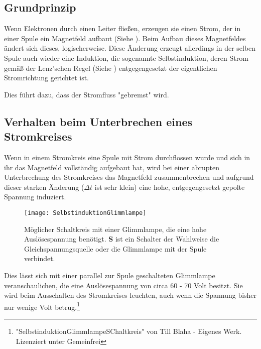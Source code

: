 \subsection{Grundprinzip}

Wenn Elektronen durch einen Leiter fließen, erzeugen sie einen Strom, der in einer Spule ein Magnetfeld aufbaut (Siehe ). Beim Aufbau dieses Magnetfeldes ändert sich dieses, logischerweise. Diese Änderung erzeugt allerdings in der selben Spule auch wieder eine Induktion, die sogenannte Selbstinduktion, deren Strom gemäß der Lenz'schen Regel (Siehe ) entgegengesetzt der eigentlichen Stromrichtung gerichtet ist.

Dies führt dazu, dass der Stromfluss "gebremst" wird.

\subsection{Verhalten beim Unterbrechen eines Stromkreises}

Wenn in einem Stromkreis eine Spule mit Strom durchflossen wurde und sich in ihr das Magnetfeld vollständig aufgebaut hat, wird bei einer abrupten Unterbrechung des Stromkreises das Magnetfeld zusammenbrechen und aufgrund dieser starken Änderung ($\Delta t$ ist sehr klein) eine hohe, entgegengesetzt gepolte Spannung induziert.

\begin{figure}
	\texttt{[image: SelbstinduktionGlimmlampe]}
	\caption{Möglicher Schaltkreis mit einer Glimmlampe, die eine hohe Auslösespannung benötigt. \textbf{S} ist ein Schalter der Wahlweise die Gleichspannungsquelle oder die Glimmlampe mit der Spule verbindet.}
	\label{fig:SchaltkreisGlimmlampe}
\end{figure}

Dies lässt sich mit einer parallel zur Spule geschalteten Glimmlampe veranschaulichen, die eine Auslösespannung von circa 60 - 70 Volt besitzt. Sie wird beim Ausschalten des Stromkreises leuchten, auch wenn die Spannung bisher nur wenige Volt betrug.\footnote{"SelbstinduktionGlimmlampeSChaltkreis" von Till Blaha - Eigenes Werk. Lizenziert unter Gemeinfrei}